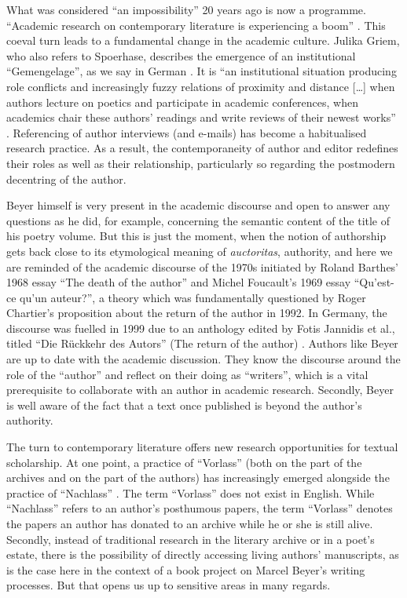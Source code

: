 \documentclass{article}
\begin{document}
What was considered ``an impossibility'' 20 years ago \citep{steinfeld_literaturwissenschaft_1997,spoerhase_literaturwissenschaft_2014} is now a programme. ``Academic research on contemporary
literature is experiencing a boom'' \parencite{noauthor_dfg-graduiertenkolleg_nodate}. This coeval turn leads to a fundamental change in
the academic culture. Julika Griem, who also refers to Spoerhase,
describes the emergence of an institutional ``Gemengelage'', as we say in German \citep[101]{griem_standards_2015}. It is ``an institutional situation producing role
conflicts and increasingly fuzzy relations of proximity and distance
{[}\ldots{]} when authors lecture on poetics and participate in academic
conferences, when academics chair these authors' readings and write
reviews of their newest works'' \parencite{noauthor_info_nodate}.
Referencing of author interviews (and e-mails) has become a habitualised
research practice. As a result, the contemporaneity of author and editor
redefines their roles as well as their relationship, particularly so
regarding the postmodern decentring of the author.

Beyer himself is very present in the academic discourse and open to
answer any questions as he did, for example, concerning the semantic
content of the title of his poetry volume. But this is just the moment,
when the notion of authorship gets back close to its etymological
meaning of \emph{auctoritas}, authority, and here we are reminded of the
academic discourse of the 1970s initiated by Roland Barthes' 1968 essay
``The death of the author'' and Michel Foucault's 1969 essay ``Qu'est-ce
qu'un auteur?'', a theory which was fundamentally questioned by Roger
Chartier's proposition about the return of the author in 1992. In
Germany, the discourse was fuelled in 1999 due to an anthology edited by
Fotis Jannidis et al., titled ``Die Rückkehr des Autors'' (The return of
the author) \citep{jannidis_ruckkehr_1999}. Authors like Beyer are up to date with the
academic discussion. They know the discourse around the role of the
``author'' and reflect on their doing as ``writers'', which is a vital
prerequisite to collaborate with an author in academic research.
Secondly, Beyer is well aware of the fact that a text once published is
beyond the author's authority.

The turn to contemporary literature offers new research opportunities
for textual scholarship. At one point, a practice of ``Vorlass'' (both on the part of the archives
and on the part of the authors) has increasingly emerged alongside the practice of ``Nachlass'' \citep{sina_nachlassbewusstsein_2017}. The term ``Vorlass'' does not exist in English. While
``Nachlass'' refers to an author's posthumous papers, the term
``Vorlass'' denotes the papers an author has donated to an archive while
he or she is still alive. Secondly, instead of traditional research in
the literary archive or in a poet's estate, there is the possibility of
directly accessing  living authors' manuscripts, as is the
case here in the context of a book project on Marcel Beyer's writing
processes. But that opens us up to sensitive areas in many regards.
\end{document}
